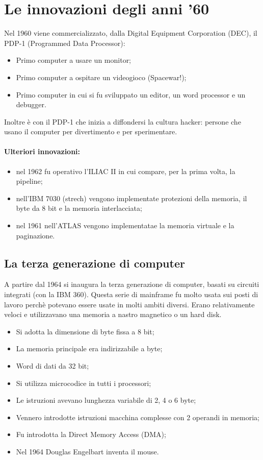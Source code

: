 \section{Le innovazioni degli anni '60}

Nel 1960 viene commercializzato, dalla Digital Equipment Corporation (DEC),
 il PDP-1 (Programmed Data Processor):

 \begin{itemize}
    \item Primo computer a usare un monitor;
    \item Primo computer a ospitare un videogioco (Spacewar!);
    \item Primo computer in cui si fu sviluppato un editor, un word processor
    e un debugger.
 \end{itemize}

Inoltre è con il PDP-1 che inizia a diffondersi la cultura hacker: persone
che usano il computer per divertimento e per sperimentare.
\paragraph{Ulteriori innovazioni:}
\begin{itemize}
    \item nel 1962 fu operativo l'ILIAC II in cui compare, per la prima volta,
    la pipeline;
    \item nell'IBM 7030 (strech) vengono implementate protezioni della memoria,
    il byte da 8 bit e la memoria interlacciata;
    \item nel 1961 nell'ATLAS vengono implementatae la memoria virtuale e la paginazione.
\end{itemize}

\subsection{La terza generazione di computer}

A partire dal 1964 si inaugura la terza generazione di computer,
basati su circuiti integrati (con la IBM 360).
Questa serie di mainframe fu molto usata sui posti di lavoro perchè
potevano essere usate in molti ambiti diversi. Erano relativamente
veloci e utilizzavano una memoria a nastro magnetico o un hard disk.

\begin{itemize}
    \item Si adotta la dimensione di byte fissa a 8 bit;
    \item La memoria principale era indirizzabile a byte;
    \item Word di dati da 32 bit;
    \item Si utilizza microcodice in tutti i processori;
    \item Le istruzioni avevano lunghezza variabile di 2, 4 o 6 byte;
    \item Vennero introdotte istruzioni macchina complesse con 2 operandi in memoria;
    \item Fu introdotta la Direct Memory Access (DMA);
    \item Nel 1964 Douglas Engelbart inventa il mouse.
\end{itemize}

